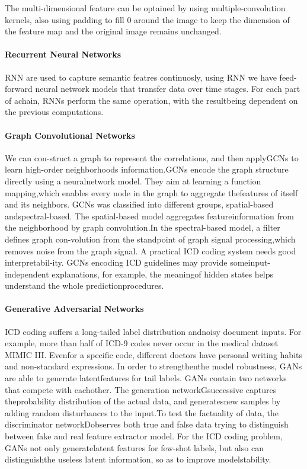 The multi-dimensional feature can be optained by using multiple-convolution kernels, also using padding to fill 0 around the image to keep the dimension of the feature map and the original image remains unchanged.

\paragraph{Recurrent Neural Networks}
RNN are used to capture semantic featres continuosly, using RNN we have feed-forward neural network models that transfer data over time stages.
For  each  part  of  achain,  RNNs  perform  the  same  operation,  with  the  resultbeing dependent on the previous computations. 

\paragraph{Graph Convolutional Networks}
We can con-struct a graph to represent the correlations, and then applyGCNs to learn high-order neighborhoods information.GCNs encode the graph structure directly using a neuralnetwork model. They aim at learning a function mapping,which  enables  every  node  in  the  graph  to  aggregate  thefeatures of itself and its neighbors.
GCNs was classified into different groups, spatial-based andspectral-based. The spatial-based model aggregates featureinformation from the neighborhood by graph convolution.In  the  spectral-based  model,  a  filter  defines  graph  con-volution  from  the  standpoint  of  graph  signal  processing,which  removes  noise  from  the  graph  signal.
A practical ICD coding system needs good interpretabil-ity.  GCNs  encoding  ICD  guidelines  may  provide  someinput-independent explanations, for example, the meaningof  hidden  states  helps  understand  the  whole  predictionprocedures.

\paragraph{Generative Adversarial Networks}
ICD  coding  suffers  a  long-tailed  label  distribution  andnoisy document inputs. For example, more than half of ICD-9 codes never occur in the medical dataset MIMIC III.
Evenfor a specific code, different doctors have personal writing habits and non-standard expressions. In order to strengthenthe  model  robustness,  GANs  are  able  to  generate  latentfeatures for tail labels.
GANs  contain  two  networks  that  compete  with  eachother.  The  generation  networkGsuccessive  captures  theprobability  distribution  of  the  actual  data,  and  generatesnew samples by adding random disturbances to the input.To test the factuality of data, the discriminator networkDobserves both true and false data trying to distinguish between fake and real feature extractor model. 
For  the  ICD  coding  problem,  GANs  not  only  generatelatent features for few-shot labels, but also can distinguishthe  useless  latent  information,  so  as  to  improve  modelstability.

